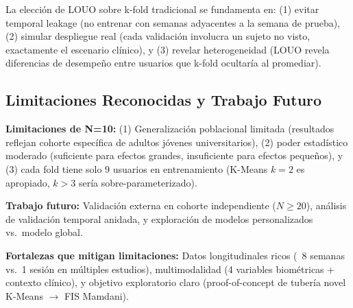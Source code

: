 La elección de LOUO sobre k-fold tradicional se fundamenta en: (1) evitar temporal leakage (no entrenar con semanas adyacentes a la semana de prueba), (2) simular despliegue real (cada validación involucra un sujeto no visto, exactamente el escenario clínico), y (3) revelar heterogeneidad (LOUO revela diferencias de desempeño entre usuarios que k-fold ocultaría al promediar).

\subsection{Limitaciones Reconocidas y Trabajo Futuro}
\label{subsec:limitaciones_trabajo_futuro}

\textbf{Limitaciones de N=10:} (1) Generalización poblacional limitada (resultados reflejan cohorte específica de adultos jóvenes universitarios), (2) poder estadístico moderado (suficiente para efectos grandes, insuficiente para efectos pequeños), y (3) cada fold tiene solo 9 usuarios en entrenamiento (K-Means $k=2$ es apropiado, $k > 3$ sería sobre-parameterizado).

\textbf{Trabajo futuro:} Validación externa en cohorte independiente ($N \geq 20$), análisis de validación temporal anidada, y exploración de modelos personalizados vs.\ modelo global.

\textbf{Fortalezas que mitigan limitaciones:} Datos longitudinales ricos (~8 semanas vs.\ 1 sesión en múltiples estudios), multimodalidad (4 variables biométricas + contexto clínico), y objetivo exploratorio claro (proof-of-concept de tubería novel K-Means $\rightarrow$ FIS Mamdani).
